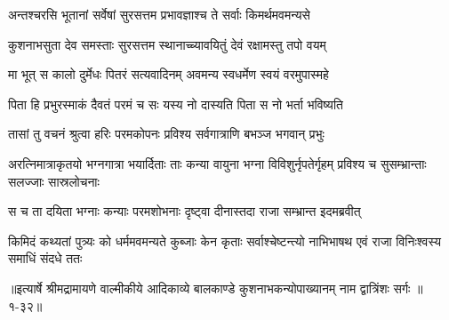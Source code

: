 \twolineshloka
{अन्तश्चरसि भूतानां सर्वेषां सुरसत्तम}
{प्रभावज्ञाश्च ते सर्वाः किमर्थमवमन्यसे} %

\twolineshloka
{कुशनाभसुता देव समस्ताः सुरसत्तम}
{स्थानाच्च्यावयितुं देवं रक्षामस्तु तपो वयम्} %

\twolineshloka
{मा भूत् स कालो दुर्मेधः पितरं सत्यवादिनम्}
{अवमन्य स्वधर्मेण स्वयं वरमुपास्महे} %

\twolineshloka
{पिता हि प्रभुरस्माकं दैवतं परमं च सः}
{यस्य नो दास्यति पिता स नो भर्ता भविष्यति} %

\twolineshloka
{तासां तु वचनं श्रुत्वा हरिः परमकोपनः}
{प्रविश्य सर्वगात्राणि बभञ्ज भगवान् प्रभुः} %

\threelineshloka
{अरत्निमात्राकृतयो भग्नगात्रा भयार्दिताः}
{ताः कन्या वायुना भग्ना विविशुर्नृपतेर्गृहम्}
{प्रविश्य च सुसम्भ्रान्ताः सलज्जाः सास्रलोचनाः} %

\twolineshloka
{स च ता दयिता भग्नाः कन्याः परमशोभनाः}
{दृष्ट्वा दीनास्तदा राजा सम्भ्रान्त इदमब्रवीत्} %

\threelineshloka
{किमिदं कथ्यतां पुत्र्यः को धर्ममवमन्यते}
{कुब्जाः केन कृताः सर्वाश्चेष्टन्त्यो नाभिभाषथ}
{एवं राजा विनिःश्वस्य समाधिं संदधे ततः} %


॥इत्यार्षे श्रीमद्रामायणे वाल्मीकीये आदिकाव्ये बालकाण्डे कुशनाभकन्योपाख्यानम् नाम द्वात्रिंशः सर्गः ॥१-३२॥

